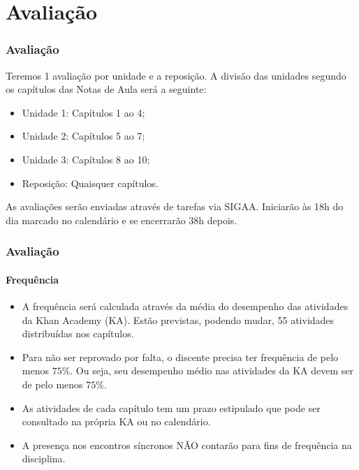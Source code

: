 \section{Avaliação}


\begin{frame}
	\frametitle{Avaliação}

	Teremos 1 avaliação por unidade e a reposição. A divisão das unidades segundo os capítulos das Notas de Aula será a seguinte:
	\begin{itemize}
		\item Unidade 1: Capítulos 1 ao 4;
		\item Unidade 2: Capítulos 5 ao 7;
		\item Unidade 3: Capítulos 8 ao 10;
		\item Reposição: Quaisquer capítulos.
	\end{itemize}\pause

	As avaliações serão enviadas através de tarefas via SIGAA. Iniciarão às 18h do dia marcado no calendário e se encerrarão 38h depois.
\end{frame}


\begin{frame}
	\frametitle{Avaliação}
	\framesubtitle{Frequência}

	\begin{itemize}
		\item A frequência será calculada através da média do desempenho das atividades da Khan Academy (KA). Estão previstas, podendo mudar, 55 atividades distribuídas nos capítulos.
		\item Para não ser reprovado por falta, o discente precisa ter frequência de pelo menos $75\%$. Ou seja, seu desempenho médio nas atividades da KA devem ser de pelo menos $75\%$.
		\item As atividades de cada capítulo tem um prazo estipulado que pode ser consultado na própria KA ou no calendário. \pause
		\item A presença nos encontros síncronos NÃO contarão para fins de frequência na disciplina.
	\end{itemize}
		
\end{frame}
